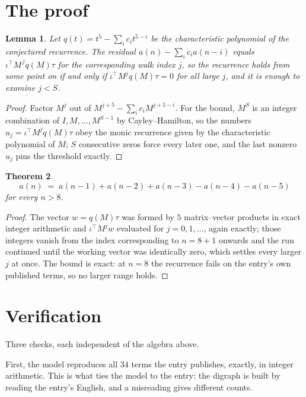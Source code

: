 \documentclass[11pt,a4paper]{article}
\theoremstyle{plain}
\newtheorem{theorem}{Theorem}
\newtheorem{lemma}[theorem]{Lemma}
\theoremstyle{definition}
\begin{document}
\section{The proof}

\begin{lemma}\label{lem:crit}
Let $q(t)=t^{5}-\sum_i c_it^{5-i}$ be the characteristic polynomial of the
conjectured recurrence. The residual $a(n)-\sum_ic_ia(n-i)$ equals
$\iota^{\!\top}M^{\,j}q(M)\tau$ for the corresponding walk index $j$, so the recurrence
holds from some point on if and only if $\iota^{\!\top}M^{j}q(M)\tau=0$ for all large $j$,
and it is enough to examine $j<S$.
\end{lemma}

\begin{proof}
Factor $M^{j}$ out of $M^{j+5}-\sum_ic_iM^{j+5-i}$. For the bound, $M^{S}$
is an integer combination of $I,M,\dots,M^{S-1}$ by Cayley--Hamilton, so the numbers
$u_j=\iota^{\!\top}M^{j}q(M)\tau$ obey the monic recurrence given by the characteristic
polynomial of $M$; $S$ consecutive zeros force every later one, and the last nonzero $u_j$
pins the threshold exactly.
\end{proof}

\begin{theorem}
\[
a(n)\;=\;a(n-1) + a(n-2) + a(n-3) - a(n-4) - a(n-5)
\]
for every $n>8$.
\end{theorem}

\begin{proof}
The vector $w=q(M)\tau$ was formed by $5$ matrix--vector products in exact integer
arithmetic and $\iota^{\!\top}M^{j}w$ evaluated for $j=0,1,\dots$, again exactly; those
integers vanish from the index corresponding to $n=8+1$ onwards and the run continued
until the working vector was identically zero, which settles every larger $j$ at once. The bound is exact: at $n=8$ the recurrence fails on the entry's own published terms, so no larger range holds.
\end{proof}

\section{Verification}

Three checks, each independent of the algebra above.

First, the model reproduces all $34$ terms the entry publishes, exactly, in integer
arithmetic. This is what ties the model to the entry: the digraph is built by reading the
entry's English, and a misreading gives different counts.
\end{document}
